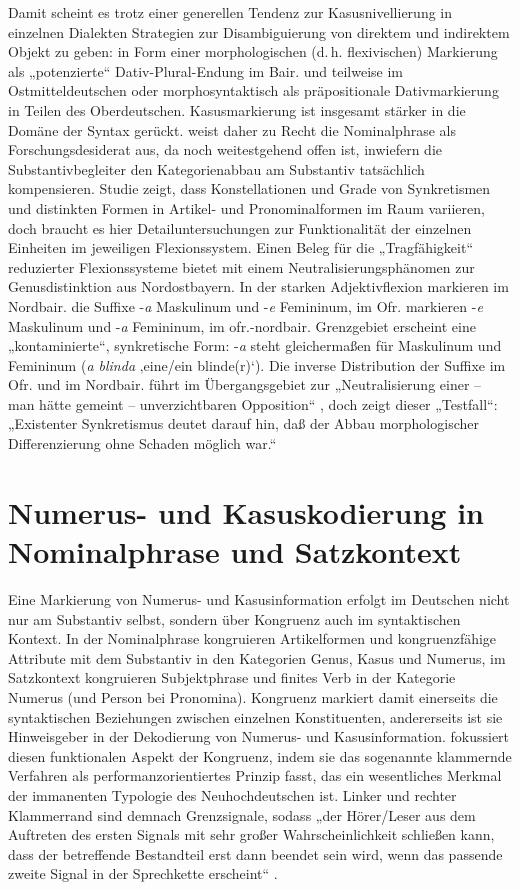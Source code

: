 Damit scheint es trotz einer generellen Tendenz zur Kasusnivellierung in einzelnen Dialekten Strategien zur Disambiguierung von direktem und indirektem Objekt zu geben: in Form einer morphologischen (d.\,h. flexivischen) Markierung als „potenzierte“ Dativ-Plural-Endung im Bair. und teilweise im Ostmitteldeutschen oder morphosyntaktisch als präpositionale Dativmarkierung in Teilen des Oberdeutschen. Kasusmarkierung ist insgesamt stärker in die Domäne der Syntax gerückt. \citet[80]{Nübling2005} weist daher zu Recht die Nominalphrase als Forschungsdesiderat aus, da noch weitestgehend offen ist, inwiefern die Substantivbegleiter den Kategorienabbau am Substantiv tatsächlich kompensieren.  Studie zeigt, dass Konstellationen und Grade von Synkretismen und distinkten Formen in Artikel- und Pronominalformen im Raum variieren, doch braucht es hier Detailuntersuchungen zur Funktionalität der einzelnen Einheiten im jeweiligen Flexionssystem. Einen Beleg für die „Tragfähigkeit“ reduzierter Flexionssysteme bietet \citet{Harnisch1984} mit einem Neutralisierungsphänomen zur Genusdistinktion aus Nordostbayern. In der starken Adjektivflexion markieren im Nordbair. die Suffixe -\textit{a} Maskulinum und -\textit{e} Femininum, im Ofr. markieren -\textit{e} Maskulinum und -\textit{a} Femininum, im ofr.-nordbair. Grenzgebiet erscheint eine „kontaminierte“, synkretische Form: -\textit{a} steht gleichermaßen für Maskulinum und Femininum (\textit{a blinda} ‚eine/ein blinde(r)‘). Die inverse Distribution der Suffixe im Ofr. und im Nordbair. führt im Übergangsgebiet zur „Neutralisierung einer -- man hätte gemeint -- unverzichtbaren Opposition“ \citep[89]{Harnisch1984}, doch zeigt dieser „Testfall“: „Existenter Synkretismus deutet darauf hin, daß der Abbau morphologischer Differenzierung ohne Schaden möglich war.“

\section{Numerus- und Kasuskodierung in Nominalphrase und Satzkontext}\label{sec:4.3}\largerpage
Eine Markierung von Numerus- und Kasusinformation erfolgt im Deutschen nicht nur am Substantiv selbst, sondern über Kongruenz auch im syntaktischen Kontext. In der Nominalphrase kongruieren Artikelformen und kongruenzfähige Attribute mit dem Substantiv in den Kategorien Genus, Kasus und Numerus, im Satzkontext kongruieren Subjektphrase und finites Verb in der Kategorie Numerus (und Person bei Pronomina). Kongruenz markiert damit einerseits die syntaktischen Beziehungen zwischen einzelnen Konstituenten, andererseits ist sie Hinweisgeber in der Dekodierung von Numerus- und Kasusinformation. \citet{Ronneberger-Sibold1994, Ronneberger-Sibold2010} fokussiert diesen funktionalen Aspekt der Kongruenz, indem sie das sogenannte klammernde Verfahren als performanzorientiertes Prinzip fasst, das ein wesentliches Merkmal der immanenten Typologie des Neuhochdeutschen ist. Linker und rechter Klammerrand sind demnach Grenzsignale, sodass „der Hörer/Leser aus dem Auftreten des ersten Signals mit sehr großer Wahrscheinlichkeit schließen kann, dass der betreffende Bestandteil erst dann beendet sein wird, wenn das passende zweite Signal in der Sprechkette erscheint“ \citep[722]{Ronneberger-Sibold2010}.

